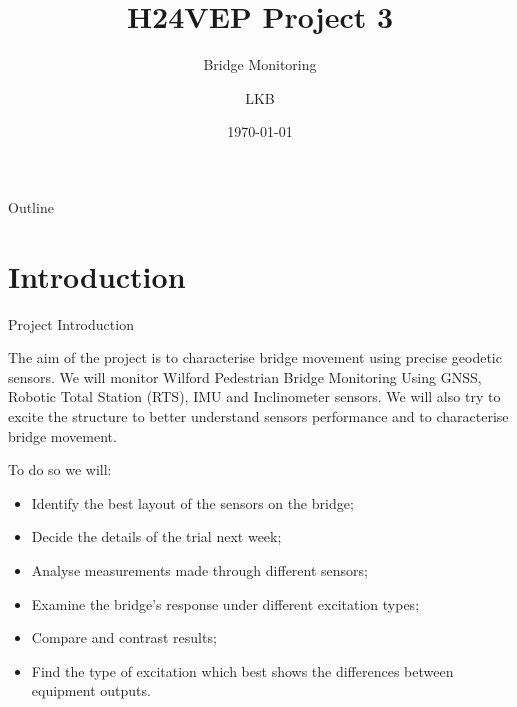 \documentclass[11pt]{beamer}
\title[H24VEP]{H24VEP Project 3}
\subtitle{Bridge Monitoring}
\author{LKB}
\institute{NGI}
\date{\today}
\begin{document}
	
	\begin{frame}
		\titlepage
	\end{frame}
	
	\begin{frame}{Outline}
		\tableofcontents
	\end{frame}
	
\section{Introduction}

\begin{frame}[allowframebreaks]{Project Introduction}

The aim of the project is to characterise bridge movement using precise geodetic sensors. We will monitor Wilford Pedestrian Bridge Monitoring Using GNSS, Robotic Total Station (RTS), IMU and Inclinometer sensors. We will also try to excite the structure to better understand sensors performance and to characterise bridge movement.

To do so we will:

\begin{itemize}
	\item Identify the best layout of the sensors on the bridge;
	\item Decide the details of the trial next week;
	\item Analyse measurements made through different sensors;
	\item Examine the bridge’s response under different excitation types;
	\item Compare and contrast results;
	\item Find the type of excitation which best shows the differences between equipment outputs.
\end{itemize}
\end{frame}
\end{document}
